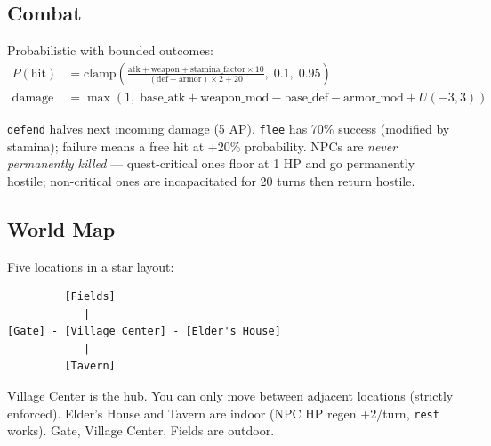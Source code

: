 \subsection{Combat}

Probabilistic with bounded outcomes:
\begin{align}
    P(\text{hit}) &= \text{clamp}\left(\frac{\text{atk} + \text{weapon} + \text{stamina\_factor} \times 10}{(\text{def} + \text{armor}) \times 2 + 20},\; 0.1,\; 0.95\right) \\
    \text{damage} &= \max\left(1,\; \text{base\_atk} + \text{weapon\_mod} - \text{base\_def} - \text{armor\_mod} + U(-3, 3)\right)
\end{align}

\texttt{defend} halves next incoming damage (5 AP). \texttt{flee} has 70\% success (modified by stamina); failure means a free hit at +20\% probability. NPCs are \emph{never permanently killed} --- quest-critical ones floor at 1 HP and go permanently hostile; non-critical ones are incapacitated for 20 turns then return hostile.

\subsection{World Map}

Five locations in a star layout:

\begin{verbatim}
         [Fields]
            |
[Gate] - [Village Center] - [Elder's House]
            |
         [Tavern]
\end{verbatim}

Village Center is the hub. You can only move between adjacent locations (strictly enforced). Elder's House and Tavern are indoor (NPC HP regen +2/turn, \texttt{rest} works). Gate, Village Center, Fields are outdoor.
